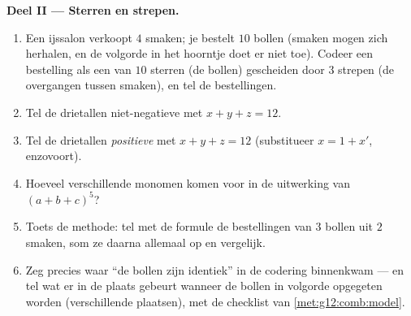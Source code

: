\begin{problem}
\medskip
\noindent\textbf{Deel II --- Sterren en strepen.}
\begin{enumerate}[resume]
  \item Een ijssalon verkoopt $4$ smaken; je bestelt $10$ bollen (smaken
        mogen zich herhalen, en de volgorde in het hoorntje doet er niet toe).
        Codeer een bestelling als een  van $10$ sterren (de bollen)
        gescheiden door $3$ strepen (de overgangen tussen smaken), en tel de
        bestellingen.
  \item Tel de drietallen niet-negatieve  met
        $x + y + z = 12$.
  \item Tel de drietallen \emph{positieve}  met
        $x + y + z = 12$ (substitueer $x = 1 + x'$, enzovoort).
  \item Hoeveel verschillende monomen komen voor in de uitwerking van
        $(a + b + c)^5$?
  \item Toets de methode: tel met de formule de bestellingen van $3$ bollen
        uit $2$ smaken, som ze daarna allemaal op en vergelijk.
  \item Zeg precies waar ``de bollen zijn identiek'' in de codering
        binnenkwam --- en tel wat er in de plaats gebeurt wanneer de bollen in
        volgorde opgegeten worden (verschillende plaatsen), met de checklist
        van \cref{met:g12:comb:model}.
\end{enumerate}


\end{problem}
